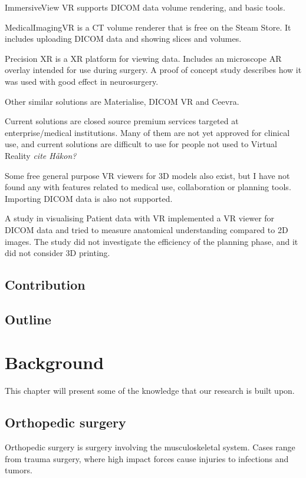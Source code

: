 \documentclass[a4paper]{report}
\begin{document}
ImmersiveView VR supports DICOM data volume rendering, and basic tools\cite{immersive}.

MedicalImagingVR is a CT volume renderer that is free on the Steam Store\cite{}. It includes uploading DICOM data and showing slices and volumes.

Precision XR is a XR platform for viewing data\cite{surgical theater}. Includes an microscope AR overlay intended for use during surgery. A proof of concept study describes how it was used with good effect in neurosurgery\cite{thejns}.

Other similar solutions are Materialise\cite{materialise_medical_nodate}, DICOM VR\cite{noauth vr} and
Ceevra\cite{ceevra_inc_using_2019}.

Current solutions are closed source premium services targeted at enterprise/medical institutions. Many of them are not yet approved for clinical use, and current solutions are difficult to use for people not used to Virtual Reality \emph{cite Håkon?}

Some free general purpose VR viewers for 3D models also exist, but I have not found any with features related to medical use, collaboration or planning tools. Importing DICOM data is also not supported.

A study in visualising Patient data with VR\cite{vertemati_virtual_2019} implemented a VR viewer for DICOM data and tried to measure anatomical understanding compared to 2D images. The study did not investigate the efficiency of the planning phase, and it did not consider 3D printing.

\section{Contribution}
\section{Outline}

\chapter{Background}\label{Background}
This chapter will present some of the knowledge that our research is built upon. 

\section{Orthopedic surgery}

Orthopedic surgery is surgery involving the musculoskeletal system. Cases range from trauma surgery, where high impact forces cause injuries to infections and tumors\cite{swiontkowski_manual_2013}.
\end{document}

